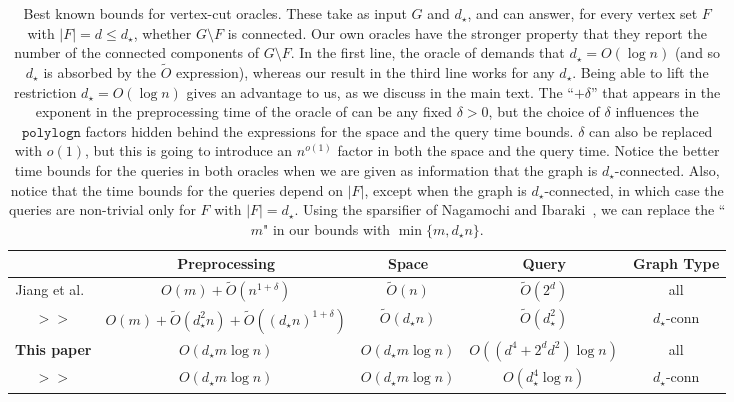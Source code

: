 \documentclass[11pt,a4paper]{article}
\begin{document}
\begin{table*}[h]
 \centering
 \hspace*{-1.2cm}
\renewcommand{\arraystretch}{1.3}
\begin{tabular}{ |c|c|c|c|c| } 
 \hline
 {} & Preprocessing & Space & Query & Graph Type\\ \hline\hline
 {Jiang et al.~\cite{arxivMerav}} & $O(m)+\widetilde{O}(n^{1+\delta})$ & $\widetilde{O}(n)$ & $\widetilde{O}(2^d)$ & all\\ \hline

 {$>>$} & $O(m)+\widetilde{O}(d_{\star}^2n)+\widetilde{O}((d_{\star}n)^{1+\delta})$ & $\widetilde{O}(d_{\star}n)$ & $\widetilde{O}(d_{\star}^2)$ & $d_{\star}$-conn\\ \hline
  {\textbf{This paper}} & $O(d_{\star}m\log{n})$ & $O(d_{\star}m\log{n})$ & $O((d^4+2^dd^2)\log{n})$ & all\\ \hline
  {$>>$} & $O(d_{\star}m\log{n})$ & $O(d_{\star}m\log{n})$ & $O(d_{\star}^4\log{n})$ & $d_{\star}$-conn\\ \hline
  
\end{tabular}
 \caption{Best known bounds for vertex-cut oracles. These take as input $G$ and $d_{\star}$, and can answer, for every vertex set $F$ with $|F|=d\leq d_{\star}$, whether $G\setminus F$ is connected. Our own oracles have the stronger property that they report the number of the connected components of $G\setminus F$. In the first line, the oracle of \cite{arxivMerav} demands that $d_{\star}=O(\log{n})$ (and so $d_{\star}$ is absorbed by the $\widetilde{O}$ expression), whereas our result in the third line works for any $d_{\star}$. Being able to lift the restriction $d_{\star}=O(\log{n})$ gives an advantage to us, as we discuss in the main text. The ``$+\delta$'' that appears in the exponent in the preprocessing time of the oracle of \cite{arxivMerav} can be any fixed $\delta>0$, but the choice of $\delta$ influences the $\mathtt{polylog{n}}$ factors hidden behind the expressions for the space and the query time bounds. $\delta$ can also be replaced with $o(1)$, but this is going to introduce an $n^{o(1)}$ factor in both the space and the query time. Notice the better time bounds for the queries in both oracles when we are given as information that the graph is $d_{\star}$-connected. Also, notice that the time bounds for the queries depend on $|F|$, except when the graph is $d_{\star}$-connected, in which case the queries are non-trivial only for $F$ with $|F|=d_{\star}$. Using the sparsifier of Nagamochi and Ibaraki~\cite{DBLP:journals/algorithmica/NagamochiI92}, we can replace the ``$m$" in our bounds with $\min\{m,d_{\star}n\}$.  \label{table:bounds4}}
\end{table*} 
\end{document}
